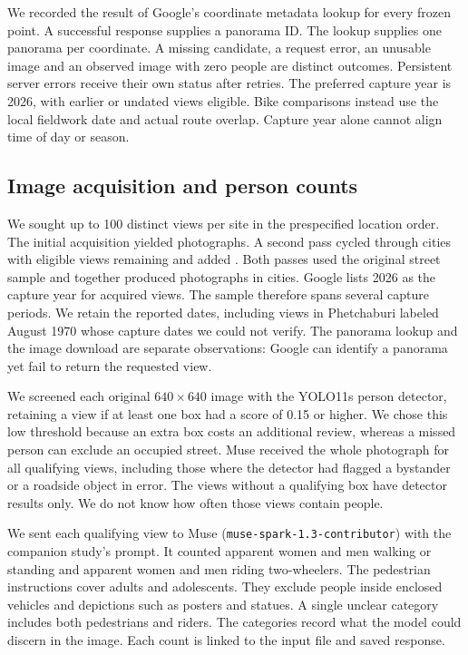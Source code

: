 \documentclass[11pt]{article}
\begin{document}
We recorded the result of Google's coordinate metadata lookup for every frozen point. A successful response supplies a panorama ID. The lookup supplies one panorama per coordinate. A missing candidate, a request error, an unusable image and an observed image with zero people are distinct outcomes. Persistent server errors receive their own status after retries. The preferred capture year is 2026, with earlier or undated views eligible. Bike comparisons instead use the local fieldwork date and actual route overlap. Capture year alone cannot align time of day or season.

\subsection{Image acquisition and person counts}
We sought up to 100 distinct views per site in the prespecified location order. The initial acquisition yielded \MWInitialImages{} photographs. A second pass cycled through cities with eligible views remaining and added \MWReserveImages{}. Both passes used the original street sample and together produced \MWImages{} photographs in \MWImageSites{} cities. Google lists 2026 as the capture year for \MWPreferredYear{} acquired views. The sample therefore spans several capture periods. We retain the reported dates, including \MWEarlyDates{} views in Phetchaburi labeled August 1970 whose capture dates we could not verify. The panorama lookup and the image download are separate observations: Google can identify a panorama yet fail to return the requested view.

We screened each original $640\times640$ image with the YOLO11s person detector, retaining a view if at least one box had a score of 0.15 or higher. We chose this low threshold because an extra box costs an additional review, whereas a missed person can exclude an occupied street. Muse received the whole photograph for all \MWSent{} qualifying views, including those where the detector had flagged a bystander or a roadside object in error. The \MWUnsent{} views without a qualifying box have detector results only. We do not know how often those views contain people.

We sent each qualifying view to Muse (\texttt{muse-spark-1.3-contributor}) with the companion study's prompt. It counted apparent women and men walking or standing and apparent women and men riding two-wheelers. The pedestrian instructions cover adults and adolescents. They exclude people inside enclosed vehicles and depictions such as posters and statues. A single unclear category includes both pedestrians and riders. The categories record what the model could discern in the image. Each count is linked to the input file and saved response.
\end{document}

